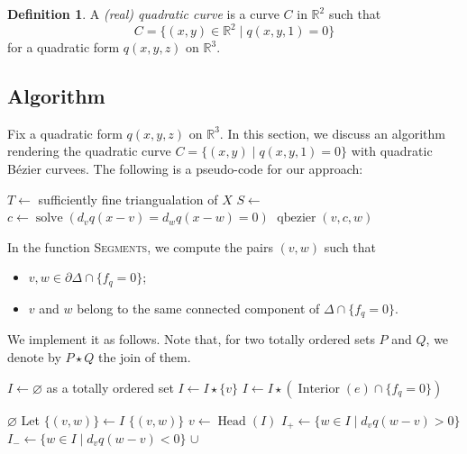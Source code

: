 \documentclass[pdftex,a4paper,12pt]{scrartcl}
\theoremstyle{plain}
\theoremstyle{definition}
\newtheorem*{definition}{Definition}
\theoremstyle{remark}
\begin{document}
\begin{definition}
A \emph{(real) quadratic curve} is a curve $C$ in $\mathbb R^2$ such that
\[
C=\{(x,y)\in\mathbb R^2\mid q(x,y,1)=0\}
\]
for a quadratic form $q(x,y,z)$ on $\mathbb R^3$.
\end{definition}

\subsection{Algorithm}

Fix a quadratic form $q(x,y,z)$ on $\mathbb R^3$.
In this section, we discuss an algorithm rendering the quadratic curve $C=\{(x,y)\mid q(x,y,1)=0\}$ with quadratic B\'ezier curvees.
The following is a pseudo-code for our approach:
\begin{algorithmic}[1]
\State $T\gets$ sufficiently fine triangualation of $X$
\State $S\gets$ 
\State $c\gets \operatorname{solve}(d_vq(x-v)=d_wq(x-w)=0)$
\State $\operatorname{qbezier}(v,c,w)$
\EndFor
\EndFor
\EndProcedure
\end{algorithmic}
In the function \textsc{Segments}, we compute the pairs $(v,w)$ such that
\begin{itemize}
  \item $v,w\in\partial\Delta\cap\{f_q=0\}$;
  \item $v$ and $w$ belong to the same connected component of $\Delta\cap\{f_q=0\}$.
\end{itemize}
We implement it as follows.
Note that, for two totally ordered sets $P$ and $Q$, we denote by $P\star Q$ the join of them.
\begin{algorithmic}[1]
\State $I\gets\varnothing$ as a totally ordered set
\State $I\gets I\star\{v\}$
\EndIf
\EndFor
{}
\State $I\gets I\star(\operatorname{Interior}(e)\cap \{f_q=0\})$
\EndFor
\State \Return {}
\EndProcedure

\State \Return $\varnothing$
\State Let $\{(v,w)\}\gets I$
\State \Return $\{(v,w)\}$
\EndIf
\State $v\gets\operatorname{Head}(I)$
\State $I_+\gets \{w\in I\mid d_vq(w-v)>0\}$
\State $I_-\gets \{w\in I\mid d_vq(w-v)<0\}$
\State \Return {} $\cup$ 
\EndProcedure
\end{algorithmic}
\end{document}

